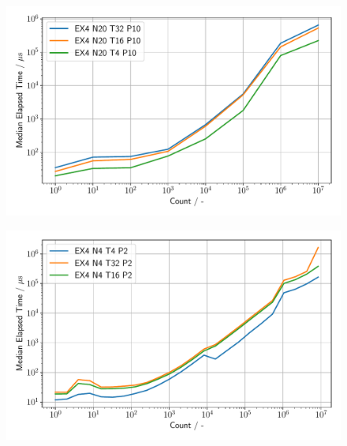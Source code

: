 \begin{figure}[h]
\centering
    \begin{minipage}{.5\textwidth}
        \centering
        \includegraphics[width=1.0\linewidth]{figures/Ex4_3.pdf}
        \label{Ex4_3_p}
    \end{minipage}%
    \begin{minipage}{.5\textwidth}
        \centering
        \includegraphics[width=1.0\linewidth]{figures/Ex4_4.pdf}
        \label{Ex4_4_p}
    \end{minipage}
\end{figure}